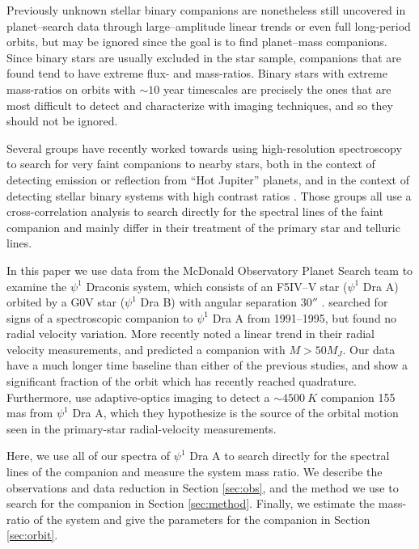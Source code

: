 \documentclass[twocolumn]{emulateapj}
\begin{document}
Previously unknown stellar binary companions are nonetheless still uncovered in planet--search data through large--amplitude linear trends or even full long-period orbits, but may be ignored since the goal is to find planet--mass companions. Since binary stars are usually excluded in the star sample, companions that are found tend to have extreme flux- and mass-ratios. Binary stars with extreme mass-ratios on orbits with $\sim 10$ year timescales are precisely the ones that are most difficult to detect and characterize with imaging techniques, and so they should not be ignored.

Several groups have recently worked towards using high-resolution spectroscopy to search for very faint companions to nearby stars, both in the context of detecting emission \citep{Snellen2010, Gullikson2013} or reflection \citep{Martins2013} from ``Hot Jupiter'' planets, and in the context of detecting stellar binary systems with high contrast ratios \citep[e.g.][]{Gullikson2013_2, Kolbl2015}. Those groups all use a cross-correlation analysis to search directly for the spectral lines of the faint companion and mainly differ in their treatment of the primary star and telluric lines.

In this paper we use data from the McDonald Observatory Planet Search team to examine the $\psi^1$ Draconis system, which consists of an F5IV--V star ($\psi^1$ Dra A) orbited by a G0V star ($\psi^1$ Dra B) with angular separation $30''$ \citep{WDS}. \cite{Tokovinin2002} searched for signs of a spectroscopic companion to $\psi^1$ Dra A from 1991--1995, but found no radial velocity variation. More recently \cite{Toyota2009} noted a linear trend in their radial velocity measurements, and predicted a companion with $M > 50 M_J$. Our data have a much longer time baseline than either of the previous studies, and show a significant fraction of the orbit which has recently reached quadrature. Furthermore, \citet{Endl2015} use adaptive-optics imaging to detect a $\sim 4500\ K$ companion 155 mas from $\psi^1$ Dra A, which they hypothesize is the source of the orbital motion seen in the primary-star radial-velocity measurements. 

Here, we use all of our spectra of $\psi^1$ Dra A to search directly for the spectral lines of the companion and measure the system mass ratio. We describe the observations and data reduction in Section \ref{sec:obs}, and the method we use to search for the companion in Section \ref{sec:method}. Finally, we estimate the mass-ratio of the system and give the parameters for the companion in Section \ref{sec:orbit}.
\end{document}
